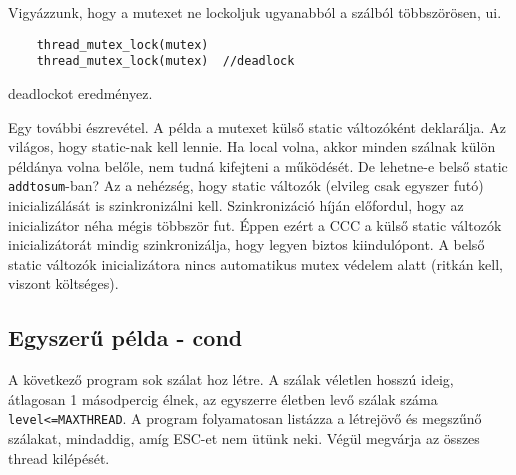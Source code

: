Vigyázzunk, hogy a mutexet ne lockoljuk ugyanabból a szálból
többszörösen, ui.
\begin{verbatim}
    thread_mutex_lock(mutex)
    thread_mutex_lock(mutex)  //deadlock
\end{verbatim}
deadlockot eredményez.

Egy további észrevétel. 
A példa a mutexet külső static változóként deklarálja. 
Az világos, hogy static-nak kell lennie. Ha local volna, akkor minden szálnak 
külön példánya volna belőle, nem tudná kifejteni a működését. De lehetne-e
belső static \verb!addtosum!-ban? Az a nehézség, hogy static változók 
(elvileg csak egyszer futó) inicializálását is szinkronizálni kell.
Szinkronizáció híján előfordul, hogy az inicializátor néha mégis többször fut.
Éppen ezért a CCC a külső static változók inicializátorát mindig 
szinkronizálja, hogy legyen biztos kiindulópont. A belső static változók 
inicializátora nincs automatikus mutex védelem alatt (ritkán kell, viszont költséges).








\subsection{Egyszerű példa - cond}


A következő program sok szálat hoz létre.
A szálak véletlen hosszú ideig, átlagosan 1 másodpercig élnek,
az egyszerre életben levő szálak száma \verb!level<=MAXTHREAD!.
A program folyamatosan listázza a létrejövő és megszűnő szálakat,
mindaddig, amíg ESC-et nem ütünk neki.
Végül megvárja az összes thread kilépését.

